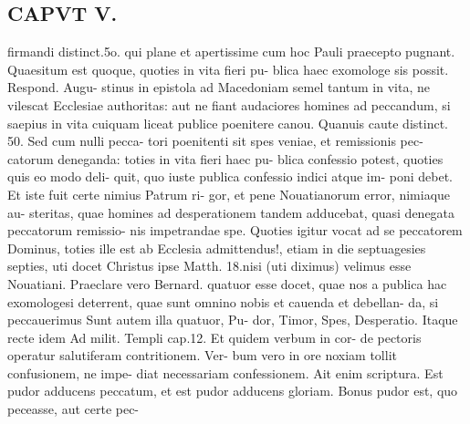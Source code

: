 \documentclass{article}
\begin{document}
\begin{pages}
\section*{CAPVT  V. }firmandi distinct.5o. qui plane et apertissime cum hoc Pauli praecepto pugnant. Quaesitum est quoque, quoties in vita fieri pu- blica haec exomologe sis possit. Respond. Augu- stinus in epistola ad Macedoniam semel tantum in vita, ne vilescat Ecclesiae authoritas: aut ne fiant audaciores homines ad peccandum, si saepius in vita cuiquam liceat publice poenitere canou. Quanuis caute distinct. 50. Sed cum nulli pecca- tori poenitenti sit spes veniae, et remissionis pec- catorum deneganda: toties in vita fieri haec pu- blica confessio potest, quoties quis eo modo deli- quit, quo iuste publica confessio indici atque im- poni debet. Et iste fuit certe nimius Patrum ri- gor, et pene Nouatianorum error, nimiaque au- steritas, quae homines ad desperationem tandem adducebat, quasi denegata peccatorum remissio- nis impetrandae spe. Quoties igitur vocat ad se peccatorem Dominus, toties ille est ab Ecclesia admittendus!, etiam in die septuagesies septies, uti docet Christus ipse Matth. 18.nisi (uti diximus) velimus esse Nouatiani. Praeclare vero Bernard. quatuor esse docet, quae nos a publica hac exomologesi deterrent, quae sunt omnino nobis et cauenda et debellan- da, si peccauerimus Sunt autem illa quatuor, Pu- dor, Timor, Spes, Desperatio. Itaque recte idem Ad milit. Templi cap.12. Et quidem verbum in cor- de pectoris operatur salutiferam contritionem. Ver- bum vero in ore noxiam tollit confusionem, ne impe- diat necessariam confessionem. Ait enim scriptura. Est pudor adducens peccatum, et est pudor adducens gloriam. Bonus pudor est, quo peceasse, aut certe pec- 

\end{pages}
\end{document}
